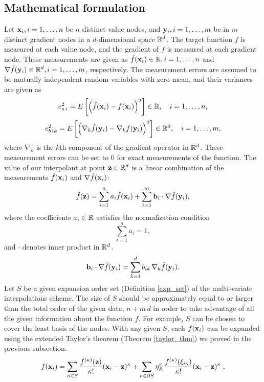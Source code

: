 \subsection{Mathematical formulation}
Let $\mathbf{x}_i, i=1,\ldots,n$ be $n$ distinct value nodes, and
$\mathbf{y}_i, i=1,\ldots,m$ be in $m$ distinct gradient nodes in a
$d$-dimensional space $\mathbb{R}^d$.  The target function
$f$ is measured at each value node, and the gradient of $f$ is measured
at each gradient node.  These measurements are given as
${\hat f}(\mathbf{x}_i)\in \mathbb{R}, i=1,\ldots,n$ and
$\nabla {\hat f}(\mathbf{y}_i)\in \mathbb{R}^d, i=1,\ldots,m$, respectively.  The measurement
errors are assumed to be mutually independent random variables with zero mean,
and their variances are given as
\[ e_{a\,i}^2 = E\left[\left({\hat f}(\mathbf{x}_i) - f(\mathbf{x}_i)\right)^2\right] \in \mathbb{R},
   \quad i = 1,\ldots,n ,\]
\[ e_{b\,ik}^2 =
   E\left[\left(\nabla_k{\hat f}(\mathbf{y}_i) - \nabla_k f(\mathbf{y}_i)\right)^2\right]
   \in \mathbb{R}^d, \quad i = 1,\ldots,m , \]
where $\nabla_k$ is the $k$th component of the gradient operator in $\mathbb{R}^d$.
These measurement errors can be set to 0 for exact measurements of the function.
The value of our interpolant at point $\mathbf{z}\in \mathbb{R}^d$ is a linear combination
of the measurements ${\hat f}(\mathbf{x}_i)$ and $\nabla {\hat f}(\mathbf{x}_i)$:
\begin{equation} \label{interp_nd}
  {\tilde f}(\mathbf{z}) = \sum_{i=1}^n a_i {\hat f}(\mathbf{x}_i)
                + \sum_{i=1}^m \mathbf{b}_i \cdot \nabla {\hat f}(\mathbf{y}_i),
\end{equation}
where the coefficients $a_i\in \mathbb{R}$ satisfies the normalization condition
\begin{equation} \label{normalize_nd}
  \sum_{i=1}^n a_i = 1,
\end{equation}
and $\cdot$ denotes inner product in $\mathbb{R}^d$.
\[ \mathbf{b}_i \cdot \nabla {\hat f}(\mathbf{y}_i)
 = \sum_{k=1}^d b_{ik}\, \nabla_k {\hat f}(\mathbf{y}_i) . \]
Let $S$ be a given expansion order set (Definition \ref{exp_set}) of the
multi-variate interpolations scheme.  The size of $S$ should be approximately
equal to or larger than the total order of the given data, $n + m\,d$ in order
to take advantage of all the given information about the function $f$.
For example, $S$ can be chosen to cover the least basis \cite[]{least_interp}
of the nodes.
With any given $S$,
each $f(\mathbf{x}_i)$ can be expanded using the extended Taylor's theorem (Theorem
\ref{taylor_thm}) we proved in the previous subsection.
\[ f(\mathbf{x}_i) = \sum_{\kappa\in S} \frac{f^{(\kappa)}(\mathbf{z})}{\kappa!}
             (\mathbf{x}_i-\mathbf{z})^\kappa + \sum_{\kappa\in \partial S} \eta^\kappa_S \,
           \frac{f^{(\kappa)}(\xi_{i\kappa})}{\kappa!} (\mathbf{x}_i-\mathbf{z})^\kappa \;,\]
